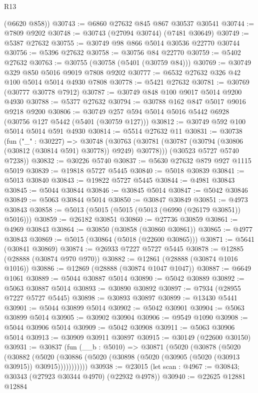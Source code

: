 \begin{lexlean}{R13}
\begin{coremodule}
      (@6620 @858))
@30743 := @6860 @27632 @845 @867 @30537 @30541
@30744 := @7809 @9202
@30748 := @30743 (@27094 @30744) (@7481 @30649)
@30749 := @5387 @27632
@30755 := @30749 @98 @866 @5014 @30536 @22770 @30744
@30756 := @5396 @27632
@30758 := @30756 @84 @22770
@30759 := @5402 @27632
@30763 := @30755 (@30758 (@5401 (@30759 @84)))
@30769 := @30749 @329 @850 @5016 @9019 @7808 @9202
@30777 := @6532 @27632 @326 @42 @100 @5014 @5014 @4930 @7808
@30778 := @5421 @27632
@30781 := @30769 (@30777 @30778 @7912)
@30787 := @30749 @848 @100 @9017 @5014 @9200 @4930
@30788 := @5377 @27632
@30794 := @30788 @162 @847 @5017 @9016 @9218 @9200
@30806 := @30749 @257 @594 @5014 @5016 @5442 @6928 (@30756 @127 @5442 (@5401 (@30759 @127)))
@30812 := @30749 @592 @100 @5014 @5014 @591 @4930
@30814 := @5514 @27632 @11
@30831 := @30738
    (fun ("_" : @30227) =>
    @30748
      (@30763 (@30781 (@30787 (@30794 (@30806 (@30812 (@30814 @591) @30778)) @9249) @30778)))
      (@30523 @5727 @5740 @7238))
@30832 := @30226 @5740
@30837 := @5630 @27632 @879 @927 @1115 @5019
@30839 := @19818 @5727 @5445
@30840 := @5018 @30839
@30841 := @5013 @30840
@30843 := @19822 @5727 @5445
@30844 := @4981 @30843
@30845 := @5044 @30844
@30846 := @30845 @5014
@30847 := @5042 @30846
@30849 := @5063 @30844 @5014
@30850 := @30847 @30849
@30851 := @4973 @30843
@30858 := @5013 (@5015 (@5015 (@5013 (@6990 (@26179 @30851)) @5016)))
@30859 := @26182 @30851
@30860 := @27736 @30859
@30861 := @4969 @30843
@30864 := @30850 (@30858 (@30860 @30861))
@30865 := @4977 @30843
@30869 := @5015 (@30864 (@5018 (@22600 @30865)))
@30871 := @5641 (@30841 @30869)
@30874 := @26933 @7227 @5727 @5445
@30878 := @12885 (@28888 (@30874 @970 @970))
@30882 := @12861 (@28888 (@30874 @1016 @1016))
@30886 := @12869 (@28888 (@30874 @1047 @1047))
@30887 := @6649 @1061
@30889 := @5044 @30887 @5014
@30890 := @5042 @30889
@30892 := @5063 @30887 @5014
@30893 := @30890 @30892
@30897 := @7934 (@28955 @7227 @5727 @5445)
@30898 := @30893 @30897
@30899 := @13430 @5441
@30901 := @5044 @30899 @5014
@30902 := @5042 @30901
@30904 := @5063 @30899 @5014
@30905 := @30902 @30904
@30906 := @9549 @1090
@30908 := @5044 @30906 @5014
@30909 := @5042 @30908
@30911 := @5063 @30906 @5014
@30913 := @30909 @30911 @30897
@30915 := @30149 (@22600 @30150)
@30931 := @30837
    (fun (__b : @5010) =>
    @30871
      (@5020
        (@30878
          (@5020
            (@30882
              (@5020 (@30886 (@5020 (@30898 (@5020 (@30905 (@5020 (@30913 @30915)) @30915)))))))))))
@30938 := @23015 (let scan : @4967 := @30843; @30343 (@27923 @30344 @4970) (@22932 @4978))
@30940 := @22625 @12881 @12884

\end{coremodule}
\end{lexlean}
